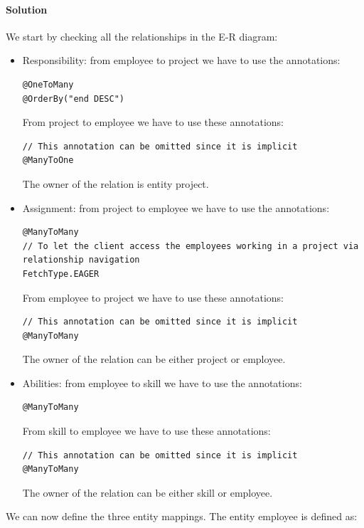 \paragraph*{Solution}
We start by checking all the relationships in the E-R diagram: 
\begin{itemize}
    \item Responsibility: from employee to project we have to use the annotations: 
        \begin{lstlisting}[style=Java]
@OneToMany
@OrderBy("end DESC")
        \end{lstlisting}
        From project to employee we have to use these annotations: 
        \begin{lstlisting}[style=Java]
// This annotation can be omitted since it is implicit
@ManyToOne
        \end{lstlisting}
        The owner of the relation is entity project. 
    \item Assignment: from project to employee we have to use the annotations: 
        \begin{lstlisting}[style=Java]
@ManyToMany
// To let the client access the employees working in a project via relationship navigation
FetchType.EAGER
        \end{lstlisting}
        From employee to project we have to use these annotations: 
        \begin{lstlisting}[style=Java]
// This annotation can be omitted since it is implicit
@ManyToMany
        \end{lstlisting}
        The owner of the relation can be either project or employee. 
    \item Abilities: from employee to skill we have to use the annotations: 
        \begin{lstlisting}[style=Java]
@ManyToMany
        \end{lstlisting}
        From skill to employee we have to use these annotations: 
        \begin{lstlisting}[style=Java]
// This annotation can be omitted since it is implicit
@ManyToMany
        \end{lstlisting}
        The owner of the relation can be either skill or employee. 
\end{itemize}
We can now define the three entity mappings. The entity employee is defined as:  
